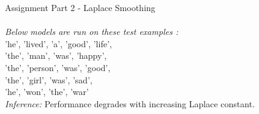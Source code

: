 \documentclass[11ppt]{article}
\begin{document}
{\rmfamily\mdseries\Large Assignment Part 2 - Laplace Smoothing}\\
\hrulefill \\
\vspace{3mm}
\textit{Below models are run on these test examples :}\\  'he', 'lived', 'a', 'good', 'life',\\ 'the', 'man', 'was', 'happy',\\ 'the', 'person', 'was', 'good',\\ 'the', 'girl', 'was', 'sad',\\ 'he', 'won', 'the', 'war'\\
\vspace{2mm}
\textit{Inference: }Performance degrades with increasing Laplace constant.\\ \vspace{2mm}
\end{document}
